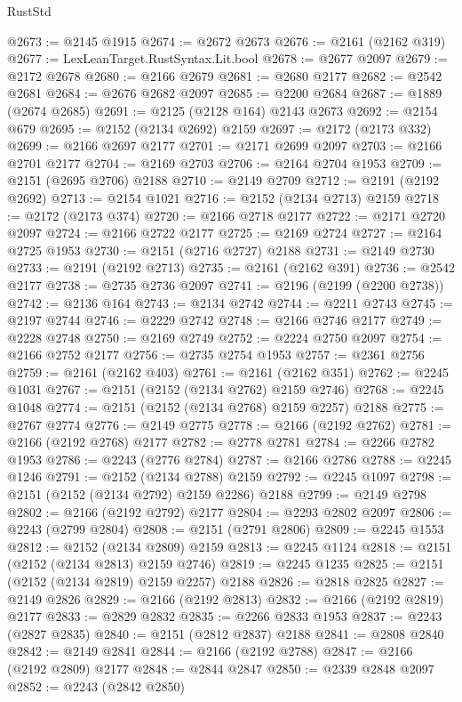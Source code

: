\begin{lexlean}{RustStd}
\begin{coremodule}
@2673 := @2145 @1915
@2674 := @2672 @2673
@2676 := @2161 (@2162 @319)
@2677 := LexLeanTarget.RustSyntax.Lit.bool
@2678 := @2677 @2097
@2679 := @2172 @2678
@2680 := @2166 @2679
@2681 := @2680 @2177
@2682 := @2542 @2681
@2684 := @2676 @2682 @2097
@2685 := @2200 @2684
@2687 := @1889 (@2674 @2685)
@2691 := @2125 (@2128 @164) @2143 @2673
@2692 := @2154 @679
@2695 := @2152 (@2134 @2692) @2159
@2697 := @2172 (@2173 @332)
@2699 := @2166 @2697 @2177
@2701 := @2171 @2699 @2097
@2703 := @2166 @2701 @2177
@2704 := @2169 @2703
@2706 := @2164 @2704 @1953
@2709 := @2151 (@2695 @2706) @2188
@2710 := @2149 @2709
@2712 := @2191 (@2192 @2692)
@2713 := @2154 @1021
@2716 := @2152 (@2134 @2713) @2159
@2718 := @2172 (@2173 @374)
@2720 := @2166 @2718 @2177
@2722 := @2171 @2720 @2097
@2724 := @2166 @2722 @2177
@2725 := @2169 @2724
@2727 := @2164 @2725 @1953
@2730 := @2151 (@2716 @2727) @2188
@2731 := @2149 @2730
@2733 := @2191 (@2192 @2713)
@2735 := @2161 (@2162 @391)
@2736 := @2542 @2177
@2738 := @2735 @2736 @2097
@2741 := @2196 (@2199 (@2200 @2738))
@2742 := @2136 @164
@2743 := @2134 @2742
@2744 := @2211 @2743
@2745 := @2197 @2744
@2746 := @2229 @2742
@2748 := @2166 @2746 @2177
@2749 := @2228 @2748
@2750 := @2169 @2749
@2752 := @2224 @2750 @2097
@2754 := @2166 @2752 @2177
@2756 := @2735 @2754 @1953
@2757 := @2361 @2756
@2759 := @2161 (@2162 @403)
@2761 := @2161 (@2162 @351)
@2762 := @2245 @1031
@2767 := @2151 (@2152 (@2134 @2762) @2159 @2746)
@2768 := @2245 @1048
@2774 := @2151 (@2152 (@2134 @2768) @2159 @2257) @2188
@2775 := @2767 @2774
@2776 := @2149 @2775
@2778 := @2166 (@2192 @2762)
@2781 := @2166 (@2192 @2768) @2177
@2782 := @2778 @2781
@2784 := @2266 @2782 @1953
@2786 := @2243 (@2776 @2784)
@2787 := @2166 @2786
@2788 := @2245 @1246
@2791 := @2152 (@2134 @2788) @2159
@2792 := @2245 @1097
@2798 := @2151 (@2152 (@2134 @2792) @2159 @2286) @2188
@2799 := @2149 @2798
@2802 := @2166 (@2192 @2792) @2177
@2804 := @2293 @2802 @2097
@2806 := @2243 (@2799 @2804)
@2808 := @2151 (@2791 @2806)
@2809 := @2245 @1553
@2812 := @2152 (@2134 @2809) @2159
@2813 := @2245 @1124
@2818 := @2151 (@2152 (@2134 @2813) @2159 @2746)
@2819 := @2245 @1235
@2825 := @2151 (@2152 (@2134 @2819) @2159 @2257) @2188
@2826 := @2818 @2825
@2827 := @2149 @2826
@2829 := @2166 (@2192 @2813)
@2832 := @2166 (@2192 @2819) @2177
@2833 := @2829 @2832
@2835 := @2266 @2833 @1953
@2837 := @2243 (@2827 @2835)
@2840 := @2151 (@2812 @2837) @2188
@2841 := @2808 @2840
@2842 := @2149 @2841
@2844 := @2166 (@2192 @2788)
@2847 := @2166 (@2192 @2809) @2177
@2848 := @2844 @2847
@2850 := @2339 @2848 @2097
@2852 := @2243 (@2842 @2850)

\end{coremodule}
\end{lexlean}
